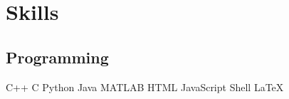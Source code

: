 \documentclass[letterpaper]{deedy-resume} %
\begin{document}
{\begin{minipage}[t]{0.33\textwidth}



%
%
%
%
%
%
%


\sectionspace %
\section{Skills}

\subsection{Programming}

C++ \textbullet{} C \textbullet{} Python \textbullet{} Java \textbullet{}  MATLAB \textbullet{} 
 HTML \textbullet{} JavaScript \textbullet{} Shell \textbullet{} LaTeX \\


\end{minipage}}
\end{document}
